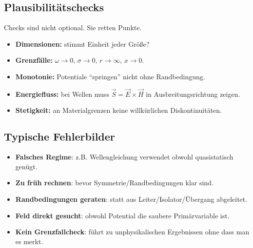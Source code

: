 \documentclass[a4paper]{article}
\newcommand{\imp}[1]{{\color{accent}\bfseries #1}}
\newcommand{\E}{\vec E}
\newcommand{\Hf}{\vec H}
\begin{document}
\subsection{Plausibilitätschecks}

\begin{schema}
Checks sind nicht optional. Sie retten Punkte.
\end{schema}

\begin{checkitem}
\begin{itemize}
  \item \imp{Dimensionen:} stimmt Einheit jeder Größe?
  \item \imp{Grenzfälle:} $\omega\to 0$, $\sigma\to 0$, $r\to\infty$, $x\to 0$.
  \item \imp{Monotonie:} Potentiale ``springen'' nicht ohne Randbedingung.
  \item \imp{Energiefluss:} bei Wellen muss $\vec S=\E\times\Hf$ in Ausbreitungsrichtung zeigen.
  \item \imp{Stetigkeit:} an Materialgrenzen keine willkürlichen Diskontinuitäten.
\end{itemize}
\end{checkitem}

\subsection{Typische Fehlerbilder}

\begin{abwandlung}
\begin{itemize}
  \item \imp{Falsches Regime}: z.B. Wellengleichung verwendet obwohl quasistatisch genügt.
  \item \imp{Zu früh rechnen}: bevor Symmetrie/Randbedingungen klar sind.
  \item \imp{Randbedingungen geraten}: statt aus Leiter/Isolator/Übergang abgeleitet.
  \item \imp{Feld direkt gesucht}: obwohl Potential die saubere Primärvariable ist.
  \item \imp{Kein Grenzfallcheck}: führt zu unphysikalischen Ergebnissen ohne dass man es merkt.
\end{itemize}
\end{abwandlung}
\end{document}
